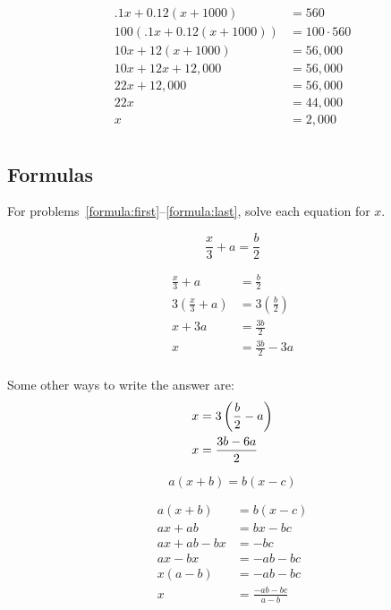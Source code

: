 \documentclass[letterpaper, landscape]{exam}
\begin{document}
\begin{questions}
      \begin{solution}
        \begin{align*}
          .1x + 0.12(x + 1000)      & = 560 \\
          100(.1x + 0.12(x + 1000)) & = 100 \cdot 560 \\
          10x + 12(x + 1000)        & = 56,000 \\
          10x + 12x + 12,000        & = 56,000 \\
          22x + 12,000              & = 56,000 \\
          22x                       & = 44,000 \\
          x                         & = 2,000 \\
        \end{align*}
      \end{solution}

    \subsection{Formulas}

    For problems~\ref{formula:first}--\ref{formula:last}, solve each equation for $x$.

    \question[10]\label{formula:first}
      \[ 
        \frac{x}{3} + a = \frac{b}{2} 
      \]

      \begin{solution}
        \begin{align*}
          \frac{x}{3} + a                  & = \frac{b}{2} \\
          3 \left( \frac{x}{3} + a \right) & = 3 \left( \frac{b}{2} \right) \\
          x + 3a                           & = \frac{3b}{2} \\
          x                                & = \frac{3b}{2} - 3a\\
        \end{align*}

        Some other ways to write the answer are: 
        \begin{align*}
          x & = 3 \del{ \frac{b}{2} - a } \\
          x & = \frac{3b - 6a}{2} \\
        \end{align*}
      \end{solution}

    \question[10]\label{formula:last}
      \[ 
        a(x + b) = b(x - c) 
      \]
      \begin{solution}
        \begin{align*}
          a(x + b)     & = b(x - c) \\
          ax + ab      & = bx - bc  \\
          ax + ab - bx & = -bc  \\
          ax - bx      & = -ab - bc  \\
          x(a - b)     & = -ab - bc  \\
          x            & = \frac{-ab - bc}{a - b}  \\
        \end{align*}


\end{solution}
\end{questions}
\end{document}
